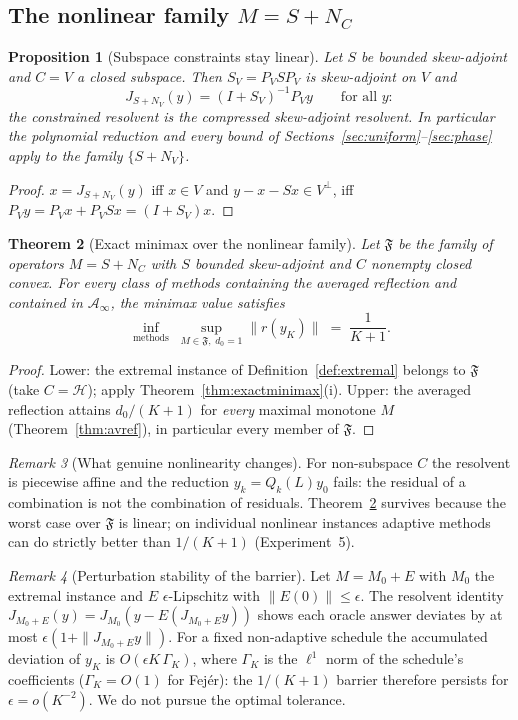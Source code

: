 \documentclass[11pt]{article}
\newtheorem{theorem}{Theorem}[section]
\newtheorem{proposition}[theorem]{Proposition}
\theoremstyle{definition}
\theoremstyle{remark}
\newtheorem{remark}[theorem]{Remark}
\newcommand{\Hh}{\mathcal{H}}
\newcommand{\Aa}{\mathcal{A}}
\newcommand{\norm}[1]{\| #1 \|}
\begin{document}
\subsection{The nonlinear family $M=S+N_C$}

\begin{proposition}[Subspace constraints stay linear]\label{prop:subspace}
Let $S$ be bounded skew-adjoint and $C=V$ a closed subspace. Then
$S_V=P_VSP_V$ is skew-adjoint on $V$ and
\[
J_{S+N_V}(y)=(I+S_V)^{-1}P_Vy\qquad\text{for all }y:
\]
the constrained resolvent is the compressed skew-adjoint resolvent. In
particular the polynomial reduction and every bound of
Sections~\ref{sec:uniform}--\ref{sec:phase} apply to the family
$\{S+N_V\}$.
\end{proposition}
\begin{proof}
$x=J_{S+N_V}(y)$ iff $x\in V$ and $y-x-Sx\in V^\perp$, iff
$P_Vy=P_Vx+P_VSx=(I+S_V)x$.
\end{proof}

\begin{theorem}[Exact minimax over the nonlinear
family]\label{thm:nonlinminimax}
Let $\mathfrak F$ be the family of operators $M=S+N_C$ with $S$ bounded
skew-adjoint and $C$ nonempty closed convex. For every class of methods
containing the averaged reflection and contained in $\Aa_\infty$, the
minimax value satisfies
\[
\inf_{\text{methods}}\;\sup_{M\in\mathfrak F,\;d_0=1}\norm{r(y_K)}
\;=\;\frac{1}{K+1}.
\]
\end{theorem}
\begin{proof}
Lower: the extremal instance of Definition~\ref{def:extremal} belongs to
$\mathfrak F$ (take $C=\Hh$); apply Theorem~\ref{thm:exactminimax}(i).
Upper: the averaged reflection attains $d_0/(K+1)$ for \emph{every} maximal
monotone $M$ (Theorem~\ref{thm:avref}), in particular every member of
$\mathfrak F$.
\end{proof}

\begin{remark}[What genuine nonlinearity changes]\label{rem:genuine}
For non-subspace $C$ the resolvent is piecewise affine and the reduction
$y_k=Q_k(L)y_0$ fails: the residual of a combination is not the combination
of residuals. Theorem~\ref{thm:nonlinminimax} survives because the worst
case over $\mathfrak F$ is linear; on individual nonlinear instances
adaptive methods can do strictly better than $1/(K+1)$
(Experiment~5).
\end{remark}

\begin{remark}[Perturbation stability of the barrier]\label{rem:perturb}
Let $M=M_0+E$ with $M_0$ the extremal instance and $E$ $\epsilon$-Lipschitz
with $\norm{E(0)}\le\epsilon$. The resolvent identity
$J_{M_0+E}(y)=J_{M_0}(y-E(J_{M_0+E}y))$ shows each oracle answer deviates by
at most $\epsilon(1+\norm{J_{M_0+E}y})$. For a fixed non-adaptive schedule
the accumulated deviation of $y_K$ is $O(\epsilon K\,\Gamma_K)$, where
$\Gamma_K$ is the $\ell^1$ norm of the schedule's coefficients
($\Gamma_K=O(1)$ for Fej\'er): the $1/(K+1)$ barrier therefore persists
for $\epsilon=o(K^{-2})$. We do not pursue the optimal tolerance.
\end{remark}
\end{document}
